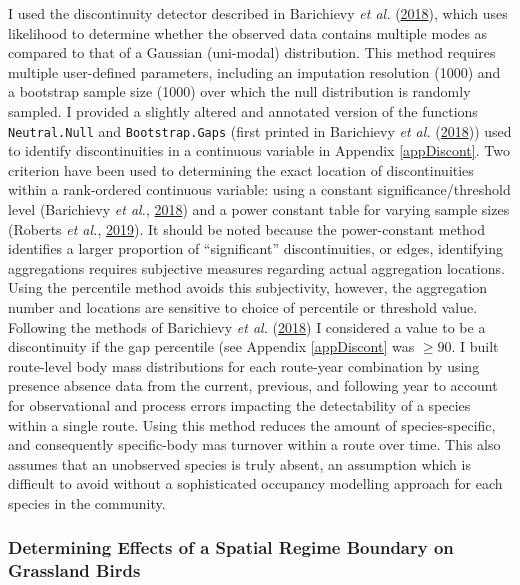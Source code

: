 \documentclass[12pt,twoside,openany]{reedthesis}
\begin{document}
I used the discontinuity detector described in Barichievy \emph{et al.} (\protect\hyperlink{ref-barichievy2018method}{2018}), which uses likelihood to determine whether the observed data contains multiple modes as compared to that of a Gaussian (uni-modal) distribution. This method requires multiple user-defined parameters, including an imputation resolution (1000) and a bootstrap sample size (1000) over which the null distribution is randomly sampled. I provided a slightly altered and annotated version of the functions \texttt{Neutral.Null} and \texttt{Bootstrap.Gaps} (first printed in Barichievy \emph{et al.} (\protect\hyperlink{ref-barichievy2018method}{2018})) used to identify discontinuities in a continuous variable in Appendix \ref{appDiscont}.
Two criterion have been used to determining the exact location of discontinuities within a rank-ordered continuous variable: using a constant significance/threshold level (Barichievy \emph{et al.}, \protect\hyperlink{ref-barichievy2018method}{2018}) and a power constant table for varying sample sizes (Roberts \emph{et al.}, \protect\hyperlink{ref-roberts2019shifting}{2019}). It should be noted because the power-constant method identifies a larger proportion of ``significant'' discontinuities, or edges, identifying aggregations requires subjective measures regarding actual aggregation locations. Using the percentile method avoids this subjectivity, however, the aggregation number and locations are sensitive to choice of percentile or threshold value. Following the methods of Barichievy \emph{et al.} (\protect\hyperlink{ref-barichievy2018method}{2018}) I considered a value to be a discontinuity if the gap percentile (see Appendix \ref{appDiscont} was \(\geq 90%
\).
I built route-level body mass distributions for each route-year combination by using presence absence data from the current, previous, and following year to account for observational and process errors impacting the detectability of a species within a single route. Using this method reduces the amount of species-specific, and consequently specific-body mas turnover within a route over time. This also assumes that an unobserved species is truly absent, an assumption which is difficult to avoid without a sophisticated occupancy modelling approach for each species in the community.

\hypertarget{determining-effects-of-a-spatial-regime-boundary-on-grassland-birds}{%
\subsubsection{Determining Effects of a Spatial Regime Boundary on Grassland Birds}\label{determining-effects-of-a-spatial-regime-boundary-on-grassland-birds}}
\end{document}
